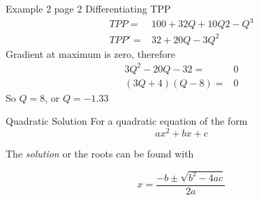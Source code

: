\documentclass[14pt,xcolor=pdftex,dvipsnames,table]{beamer}
\begin{document}
\begin{frame}{Example 2 page 2}
{Differentiating TPP}
\begin{align*}
TPP  =& 100 + 32Q + 10Q2 - Q^3\\
TPP' =& 32 +20Q -3Q^2
\end{align*}
Gradient at maximum is zero, therefore
\begin{align*}
3Q^2 - 20Q -32 = & 0\\
(3Q + 4)(Q - 8) =& 0
\end{align*}
So $Q = 8$, or $Q = -1.33$ 
\end{frame}

\begin{frame}{Quadratic Solution}
For a quadratic equation of the form
\begin{equation*}
ax^2 +bx + c
\end{equation*}

The \emph{solution} or the roots can be found with 
\begin{block}{}
\begin{equation*}
x = \frac{-b \pm \sqrt{b^2 - 4ac}}{2a}
\end{equation*}
\end{block}
\end{frame}
\end{document}
